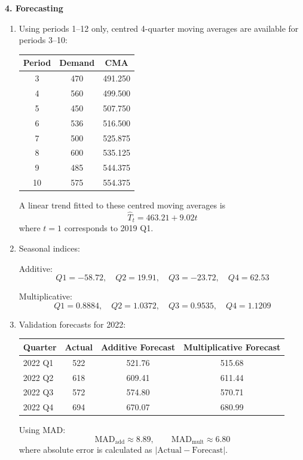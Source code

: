 \documentclass[11pt,a4paper]{article}
\begin{document}
\textbf{4. Forecasting}

\begin{enumerate}
\item Using periods 1--12 only, centred 4-quarter moving averages are available for periods 3--10:

\begin{center}
\begin{tabular}{ccc}
\toprule
Period & Demand & CMA \\
\midrule
3 & 470 & 491.250 \\
4 & 560 & 499.500 \\
5 & 450 & 507.750 \\
6 & 536 & 516.500 \\
7 & 500 & 525.875 \\
8 & 600 & 535.125 \\
9 & 485 & 544.375 \\
10 & 575 & 554.375 \\
\bottomrule
\end{tabular}
\end{center}

A linear trend fitted to these centred moving averages is
\[
\hat{T}_t = 463.21 + 9.02t
\]
where $t=1$ corresponds to 2019 Q1.

\item Seasonal indices:

Additive:
\[
Q1=-58.72,\quad Q2=19.91,\quad Q3=-23.72,\quad Q4=62.53
\]

Multiplicative:
\[
Q1=0.8884,\quad Q2=1.0372,\quad Q3=0.9535,\quad Q4=1.1209
\]

\item Validation forecasts for 2022:

\begin{center}
\begin{tabular}{lccc}
\toprule
Quarter & Actual & Additive Forecast & Multiplicative Forecast \\
\midrule
2022 Q1 & 522 & 521.76 & 515.68 \\
2022 Q2 & 618 & 609.41 & 611.44 \\
2022 Q3 & 572 & 574.80 & 570.71 \\
2022 Q4 & 694 & 670.07 & 680.99 \\
\bottomrule
\end{tabular}
\end{center}

Using MAD:
\[
\text{MAD}_{\text{add}} \approx 8.89,\qquad \text{MAD}_{\text{mult}} \approx 6.80
\]
where absolute error is calculated as $|\text{Actual} - \text{Forecast}|$.


\end{enumerate}
\end{document}
